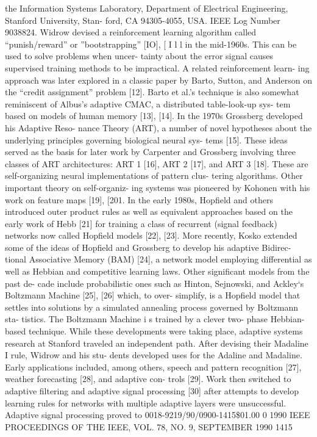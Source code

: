 the Information Systems Laboratory, Department of Electrical
Engineering, Stanford University, Stan- ford, CA 94305-4055, USA. IEEE
Log Number 9038824. Widrow devised a reinforcement learning algorithm
called ``punish/reward'' or ''bootstrapping'' {[}IO{]}, {[} I l l in the
mid-1960s. This can be used to solve problems when uncer- tainty about
the error signal causes supervised training methods to be impractical. A
related reinforcement learn- ing approach was later explored in a
classic paper by Barto, Sutton, and Anderson on the ``credit
assignment'' problem {[}12{]}. Barto et al.'s technique is also somewhat
reminiscent of Albus's adaptive CMAC, a distributed table-look-up sys-
tem based on models of human memory {[}13{]}, {[}14{]}. In the 1970s
Grossberg developed his Adaptive Reso- nance Theory (ART), a number of
novel hypotheses about the underlying principles governing biological
neural sys- tems {[}15{]}. These ideas served as the basis for later
work by Carpenter and Grossberg involving three classes of ART
architectures: ART 1 {[}16{]}, ART 2 {[}17{]}, and ART 3 {[}18{]}. These
are self-organizing neural implementations of pattern clus- tering
algorithms. Other important theory on self-organiz- ing systems was
pioneered by Kohonen with his work on feature maps {[}19{]}, {[}201. In
the early 1980s, Hopfield and others introduced outer product rules as
well as equivalent approaches based on the early work of Hebb {[}21{]}
for training a class of recurrent (signal feedback) networks now called
Hopfield models {[}22{]}, {[}23{]}. More recently, Kosko extended some
of the ideas of Hopfield and Grossberg to develop his adaptive Bidirec-
tional Associative Memory (BAM) {[}24{]}, a network model employing
differential as well as Hebbian and competitive learning laws. Other
significant models from the past de- cade include probabilistic ones
such as Hinton, Sejnowski, and Ackley`s Boltzmann Machine {[}25{]},
{[}26{]} which, to over- simplify, is a Hopfield model that settles into
solutions by a simulated annealing process governed by Boltzmann sta-
tistics. The Boltzmann Machine i s trained by a clever two- phase
Hebbian-based technique. While these developments were taking place,
adaptive systems research at Stanford traveled an independent path.
After devising their Madaline I rule, Widrow and his stu- dents
developed uses for the Adaline and Madaline. Early applications
included, among others, speech and pattern recognition {[}27{]}, weather
forecasting {[}28{]}, and adaptive con- trols {[}29{]}. Work then
switched to adaptive filtering and adaptive signal processing {[}30{]}
after attempts to develop learning rules for networks with multiple
adaptive layers were unsuccessful. Adaptive signal processing proved to
0018-9219/90/0900-1415\$01.00 0 1990 IEEE PROCEEDINGS OF THE IEEE, VOL.
78, NO. 9, SEPTEMBER 1990 1415

